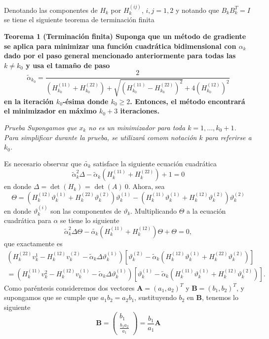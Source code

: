 Denotando las componentes de $H_k$ por $H_k^(ij)$, $i,j = 1,2$ y notando que $B_kB^T_k = I$ se tiene el siguiente teorema de terminación finita
\par \bf Teorema 1 (Terminación finita) \normalfont Suponga que un método de gradiente se aplica para minimizar una función cuadrática bidimensional con $\alpha_k$ dado por el paso general mencionado anteriormente para todas las $k\neq k_0$ y usa el tamaño de paso
$$
\tilde{\alpha}_{k_0} = \frac{2}{\left(H^{(11)}_{k_0} + H^{(22)}_{k_0}\right)+\sqrt{\left(H^{(11)}_{k_0} - H^{(22)}_{k_0}\right)^2 } + 4\left(H_{k_0}^{(12)}\right)^2}
$$
en la iteración $k_0$-ésima donde $k_0\geq 2$. Entonces, el método encontrará el minimizador en máximo $k_0+3$ iteraciones.

\it Prueba \normalfont Supongamos que $x_k$ no es un minimizador para toda $k=1, ..., k_0+1$. Para simplificar durante la prueba, se utilizará comom notación $k$ para referirse a $k_0$.
\par Es necesario observar que $\tilde{\alpha_k}$ satisface la siguiente ecuación cuadrática
$$
	\tilde{\alpha}^2_k\Delta-\tilde{\alpha}_k\left(H^(11)_k + H_k^(22)\right) + 1 = 0
$$
en donde $\Delta = \det{(H_k)}$ = $\det{(A)}\>0$. Ahora, sea
$$
\Theta = \left(H_k^{(12)}\vartheta_k^{(1)}+ H_k^{(22)}\vartheta^{(2)}_k\right)\vartheta_k^{(1)} -  \left(H_k^{(11)}\vartheta_k^{(1)}+ H_k^{(12)}\vartheta^{(2)}_k\right)\vartheta_k^{(2)} 
$$
en donde $\vartheta_k^{(i)}$ son las componentes de $\vartheta_k$. Multiplicando $\Theta$ a la ecuación cuadrática para $\alpha$ se tiene lo siguiente
$$
\tilde{\alpha}_k^2\Delta\Theta-\tilde{\alpha_k}\left(H_k^{(11)}+H_k^{(12)}\right)\Theta + \Theta = 0,
$$
que exactamente es
\begin{align*}
	(H_k^{(22)}v_k^{1}-H_k^{(12)}v_k^{(2)}-\tilde{\alpha}_k\Delta\vartheta_k^{(1)})[\vartheta_k ^{(2)}-\tilde{\alpha}_k(H_k^{(12)}\vartheta_k^{(1)}+H_k^{(22)}\vartheta_k^{(2)})]\\
	= (H_k^{(11)}v_k^{2}-H_k^{(12)}v_k^{(1)}-\tilde{\alpha}_k\Delta\vartheta_k^{(1)})[\vartheta_k ^{(1)}-\tilde{\alpha}_k(H_k^{(11)}\vartheta_k^{(1)}+H_k^{(12)}\vartheta_k^{(2)})].
\end{align*}
Como paréntesis consideremos dos vectores $\boldsymbol{A} = (a_1, a_2)^T$ y $\boldsymbol{B} = (b_1, b_2)^T$, y supongamos que se cumple que $a_1b_2 = a_2b_1$, sustituyendo $b_2$ en $\boldsymbol{B}$, tenemos lo siguiente
$$
	\boldsymbol{B} = \begin{pmatrix}b_1\\\frac{b_1a_2}{a_1}\end{pmatrix} = \frac{b_1}{a_1}\boldsymbol{A}
$$
